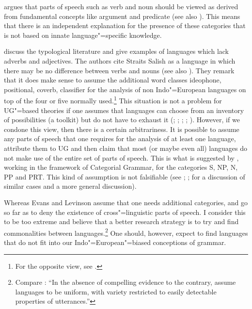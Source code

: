 \citet[]{Braine87a} argues that parts of speech such as verb and noun should be viewed as derived from fundamental concepts like argument and predicate
(see also ). This means that there is an independent explanation for the presence of these categories that is not
based on innate language"=specific knowledge.

\citet[Section~2.2.4]{EL2009a} discuss the typological literature and give examples of languages which lack adverbs and adjectives.
The authors cite Straits Salish as a language in which there may be no difference
between verbs and nouns (see also \citealp[]{EL2009b}).
They remark that it does make sense to assume the additional word classes ideophone, positional, coverb,
classifier for the analysis of non Indo"=European languages on top of the four or five normally used.\footnote{%
	For the opposite view, see .
} 
This situation is not a problem for UG"=based theories if one assumes that languages can choose from
an inventory of possibilities (a toolkit) but do not have to
exhaust it (\citealp[]{Jackendoff2002a-u}; \citealp[]{Newmeyer2005a}; \citealp*[]{FHC2005a};
\citealp[--7]{Chomsky2007a}; \citealp[, 58, 65]{CR2010a}).  However, if we condone
this view, then there is a certain arbitrariness. It is possible to assume any parts of speech that
one requires for the analysis of at least one language, attribute them to UG and then claim that
most (or maybe even all) languages do not make use of the entire set of parts of speech. This is
what is suggested by \citet[]{Villavicencio2002a}, working in the framework of Categorial
Grammar, for the categories S, NP, N, PP and PRT. This kind of assumption is not
falsifiable (see \citealp[]{Riemsdijk78a};
\citealp[]{EL2009a}; \citealp[]{Tomasello2009a} for a discussion of similar cases
and a more general discussion).

Whereas Evans and Levinson assume that one needs additional categories, \citet[]{Haspelmath2009a} and \citet[]{Croft2009a} go so far as to deny the existence of cross"=linguistic
parts of speech. I consider this to be too extreme and believe that a better research strategy is to try and find commonalities between
languages.\footnote{%
  Compare :
``In the absence of compelling evidence to the contrary, assume languages to be uniform, with variety
restricted to easily detectable properties of utterances.''
} 
One should, however, expect to find languages that do not fit into our Indo"=European"=biased conceptions of grammar.

